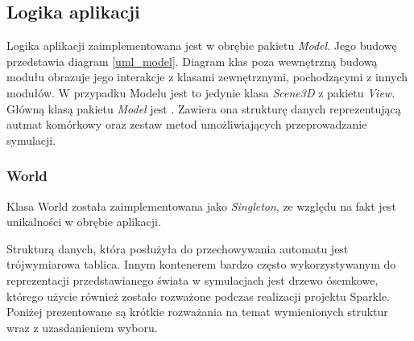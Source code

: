 \subsection {Logika aplikacji}
Logika aplikacji zaimplementowana jest w obrębie pakietu \textit{Model}.
Jego budowę przedstawia diagram \ref{uml_model}.
Diagram klas poza wewnętrzną budową modułu obrazuje jego interakcje z klasami zewnętrznymi, pochodzącymi z innych modułów.
W przypadku Modelu jest to jedynie klasa \textit{Scene3D} z pakietu \textit{View}.
Główną klasą pakietu \textit{Model} jest . Zawiera ona strukturę danych reprezentującą autmat komórkowy oraz
zestaw metod umożliwiających przeprowadzanie symulacji.
\subsubsection{World}
Klasa World została zaimplementowana jako \textit{Singleton}, ze względu na fakt
jest unikalności w obrębie aplikacji. 

Strukturą danych, która posłużyła do przechowywania automatu jest trójwymiarowa tablica. Innym kontenerem bardzo często wykorzystywanym do reprezentacji przedstawianego świata w symulacjach jest drzewo ósemkowe, którego użycie również zostało rozważone podczas realizacji projektu Sparkle. Poniżej prezentowane są krótkie rozważania na temat wymienionych struktur wraz z uzasdanieniem wyboru. 

